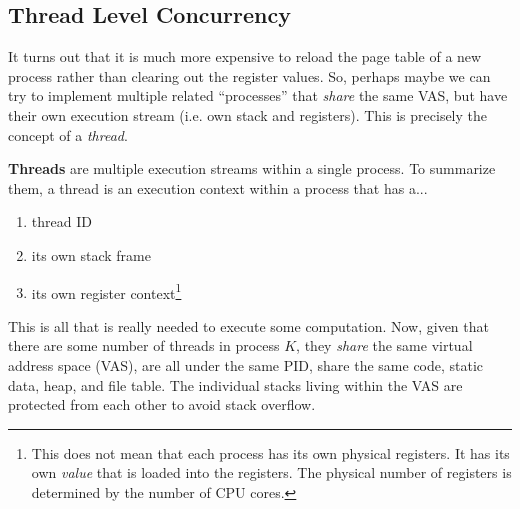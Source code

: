 \documentclass{article}
\begin{document}
  \subsection{Thread Level Concurrency}

    It turns out that it is much more expensive to reload the page table of a new process rather than clearing out the register values. So, perhaps maybe we can try to implement multiple related ``processes'' that \textit{share} the same VAS, but have their own execution stream (i.e. own stack and registers). This is precisely the concept of a \textit{thread}. 

    \begin{definition}[Threads]
      \textbf{Threads} are multiple execution streams within a single process. To summarize them, a thread is an execution context within a process that has a... 
      \begin{enumerate}
        \item thread ID 
        \item its own stack frame 
        \item its own register context\footnote{This does not mean that each process has its own physical registers. It has its own \textit{value} that is loaded into the registers. The physical number of registers is determined by the number of CPU cores. }
      \end{enumerate}
      This is all that is really needed to execute some computation. Now, given that there are some number of threads in process $K$, they \textit{share} the same virtual address space (VAS), are all under the same PID, share the same code, static data, heap, and file table. The individual stacks living within the VAS are protected from each other to avoid stack overflow. 


\end{definition}
\end{document}
